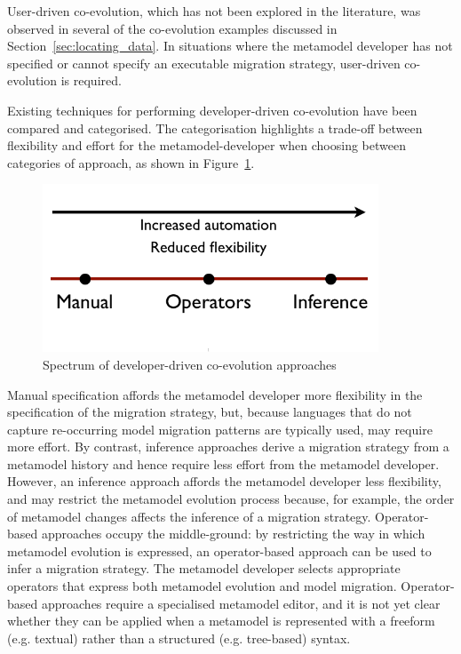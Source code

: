 User-driven co-evolution, which has not been explored in the literature, was observed in several of the co-evolution examples discussed in Section~\ref{sec:locating_data}. In situations where the metamodel developer has not specified or cannot specify an executable migration strategy, user-driven co-evolution is required.

Existing techniques for performing developer-driven co-evolution have been compared and categorised. The categorisation highlights a trade-off between flexibility and effort for the metamodel-developer when choosing between categories of approach, as shown in Figure~\ref{fig:developer_driven_coevo_spectrum}.


\begin{figure}[htbp]
	\centering
		\includegraphics[width=10cm]{4.Analysis/spectrum.png}
	\caption{Spectrum of developer-driven co-evolution approaches}
	\label{fig:developer_driven_coevo_spectrum}
\end{figure}

Manual specification affords the metamodel developer more flexibility in the specification of the migration strategy, but, because languages that do not capture re-occurring model migration patterns are typically used, may require more effort. By contrast, inference approaches derive a migration strategy from a metamodel history and hence require less effort from the metamodel developer. However, an inference approach affords the metamodel developer less flexibility, and may restrict the metamodel evolution process because, for example, the order of metamodel changes affects the inference of a migration strategy. Operator-based approaches occupy the middle-ground: by restricting the way in which metamodel evolution is expressed, an operator-based approach can be used to infer a migration strategy. The metamodel developer selects appropriate operators that express both metamodel evolution and model migration. Operator-based approaches require a specialised metamodel editor, and it is not yet clear whether they can be applied when a metamodel is represented with a freeform (e.g. textual) rather than a structured (e.g. tree-based) syntax.


